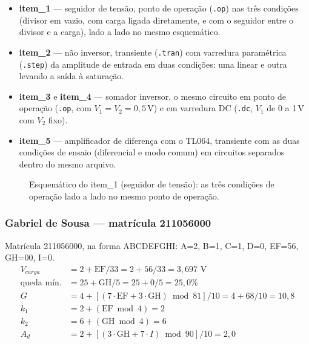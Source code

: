 \documentclass[11pt,a4paper]{article}
\begin{document}
\begin{itemize}
\item \textbf{item\_1} — seguidor de tensão, ponto de operação (\texttt{.op}) nas três
  condições (divisor em vazio, com carga ligada diretamente, e com o seguidor entre o divisor e
  a carga), lado a lado no mesmo esquemático.
\item \textbf{item\_2} — não inversor, transiente (\texttt{.tran}) com varredura paramétrica
  (\texttt{.step}) da amplitude de entrada em duas condições: uma linear e outra levando a
  saída à saturação.
\item \textbf{item\_3} e \textbf{item\_4} — somador inversor, o mesmo circuito em ponto de
  operação (\texttt{.op}, com $V_1{=}V_2{=}0{,}5\,\text{V}$) e em varredura DC
  (\texttt{.dc}, $V_1$ de 0 a 1\,V com $V_2$ fixo).
\item \textbf{item\_5} — amplificador de diferença com o TL064, transiente com as duas condições
  de ensaio (diferencial e modo comum) em circuitos separados dentro do mesmo arquivo.
\end{itemize}

\begin{figure}[htb]
\centering
\caption{Esquemático do item\_1 (seguidor de tensão): as três condições de operação lado a
lado no mesmo ponto de operação.}
\label{fig:item1}
\end{figure}

\subsubsection*{Gabriel de Sousa — matrícula 211056000}

Matrícula 211056000, na forma ABCDEFGHI: A=2, B=1, C=1, D=0, EF=56, GH=00, I=0.
\begin{align*}
V_{carga} &= 2+\text{EF}/33 = 2+56/33 = 3{,}697\text{ V} \\
\text{queda mín.} &= 25+\text{GH}/5 = 25+0/5 = 25{,}0\% \\
G &= 4+\left[(7\cdot\text{EF}+3\cdot\text{GH})\bmod 81\right]/10 = 4+68/10 = 10{,}8 \\
k_1 &= 2+(\text{EF}\bmod 4) = 2 \\
k_2 &= 6+(\text{GH}\bmod 4) = 6 \\
A_d &= 2+\left[(3\cdot\text{GH}+7\cdot I)\bmod 90\right]/10 = 2{,}0
\end{align*}
\end{document}
